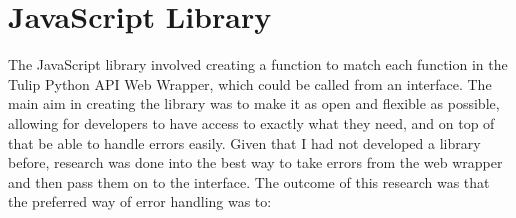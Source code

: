 \documentclass[../dissertation.tex]{subfiles}
\begin{document}
\section{JavaScript Library}
\label{sec:jslib}

The JavaScript library involved creating a function to match each function in the Tulip Python API Web Wrapper, which could be called from an interface. The main aim in creating the library was to make it as open and flexible as possible, allowing for developers to have access to exactly what they need, and on top of that be able to handle errors easily. Given that I had not developed a library before, research was done into the best way to take errors from the web wrapper and then pass them on to the interface. The outcome of this research was that the preferred way of error handling was to:
\end{document}
